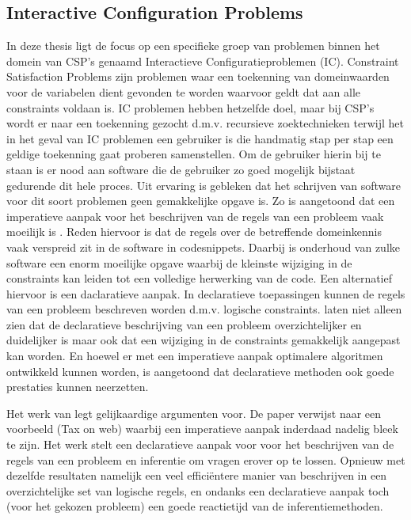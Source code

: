 \subsection{Interactive Configuration Problems}
In deze thesis ligt de focus op een specifieke groep van problemen binnen het domein van CSP's genaamd Interactieve Configuratieproblemen (IC). Constraint Satisfaction Problems zijn problemen waar een toekenning van domeinwaarden voor de variabelen dient gevonden te worden waarvoor geldt dat aan alle constraints voldaan is. IC problemen hebben hetzelfde doel, maar bij CSP's wordt er naar een toekenning gezocht d.m.v. recursieve zoektechnieken terwijl het in het geval van IC problemen een gebruiker is die handmatig stap per stap een geldige toekenning gaat proberen samenstellen. Om de gebruiker hierin bij te staan is er nood aan software die de gebruiker zo goed mogelijk bijstaat gedurende dit hele proces. Uit ervaring is gebleken dat het schrijven van software voor dit soort problemen geen gemakkelijke opgave is. Zo is aangetoond dat een imperatieve aanpak voor het beschrijven van de regels van een probleem vaak moeilijk is \citep{gelle1996interactive}. Reden hiervoor is dat de regels over de betreffende domeinkennis vaak verspreid zit in de software in codesnippets. Daarbij is onderhoud van zulke software een enorm moeilijke opgave waarbij de kleinste wijziging in de constraints kan leiden tot een volledige herwerking van de code. Een alternatief hiervoor is een daclaratieve aanpak. In declaratieve toepassingen kunnen de regels van een probleem beschreven worden d.m.v. logische constraints. \cite{gelle1996interactive} laten niet alleen zien dat de declaratieve beschrijving van een probleem overzichtelijker en duidelijker is maar ook dat een wijziging in de constraints gemakkelijk aangepast kan worden. En hoewel er met een imperatieve aanpak optimalere algoritmen ontwikkeld kunnen worden, is aangetoond dat declaratieve methoden ook goede prestaties kunnen neerzetten. 

Het werk van\citep{vlaeminck2009logical} legt gelijkaardige argumenten voor. De paper verwijst naar een voorbeeld (Tax on web) waarbij een imperatieve aanpak inderdaad nadelig bleek te zijn. Het werk stelt een declaratieve aanpak voor voor het beschrijven van de regels van een probleem en inferentie om vragen erover op te lossen. Opnieuw met dezelfde resultaten namelijk een veel effici\"{e}ntere manier van beschrijven in een overzichtelijke set van logische regels, en ondanks een declaratieve aanpak toch (voor het gekozen probleem) een goede reactietijd van de inferentiemethoden.

